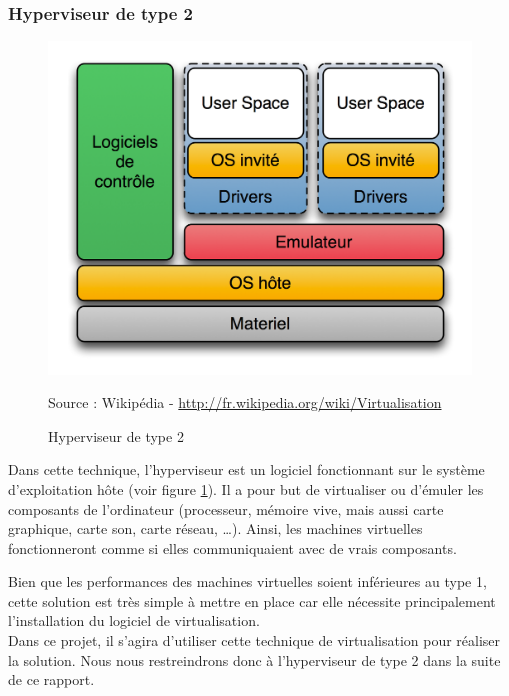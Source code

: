 
\subsubsection{Hyperviseur de type 2}

\begin{figure}[!h]
	\center
	\includegraphics[scale=0.7]{images/Hyperviseur_type2.png}
	\caption{Hyperviseur de type 2}
	Source : Wikipédia - \href{http://fr.wikipedia.org/wiki/Virtualisation}{http://fr.wikipedia.org/wiki/Virtualisation}
	\label{Schéma Hyperviseur 2}
\end{figure}

Dans cette technique, l'hyperviseur est un logiciel fonctionnant sur le système d'exploitation hôte (voir figure \ref{Schéma Hyperviseur 2}).
Il a pour but de virtualiser ou d'émuler les composants de l'ordinateur (processeur, mémoire vive, mais aussi carte graphique, carte son, carte réseau, \ldots).
Ainsi, les machines virtuelles fonctionneront comme si elles communiquaient avec de vrais composants.

Bien que les performances des machines virtuelles soient inférieures au type 1, cette solution est très simple à mettre en place car elle nécessite principalement l'installation du logiciel de virtualisation.
\\


Dans ce projet, il s'agira d'utiliser cette technique de virtualisation pour réaliser la solution.
Nous nous restreindrons donc à l'hyperviseur de type 2 dans la suite de ce rapport.
\\




